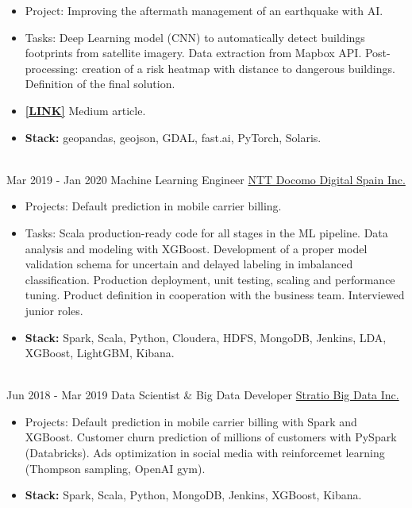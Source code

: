 \documentclass[letterpaper]{twentysecondcv} %
\begin{document}
\begin{twenty}
{\begin{itemize}
			\item Project: Improving the aftermath management of an earthquake with AI.
			\item Tasks: Deep Learning model (CNN) to automatically detect buildings footprints from satellite imagery. Data extraction from Mapbox API. Post-processing: creation of a risk heatmap with distance to dangerous buildings. Definition of the final solution.
			\item {\href{https://medium.com/omdena/estimating-street-safeness-after-an-earthquake-with-deep-learning-f2ae50b9e25e}{\textbf{[LINK]}}} Medium article.
			\item \textbf{Stack:} geopandas, geojson, GDAL, fast.ai, PyTorch, Solaris.
        \end{itemize}}
        \\
\twentyitem
    	{Mar 2019 - }
		{Jan 2020}
        {Machine Learning Engineer}
        {\href{https://www.docomodigital.com/}{NTT Docomo Digital Spain Inc.}}
        {}
        {\begin{itemize}
        \item Projects: Default prediction in mobile carrier billing. 
        \item Tasks: Scala production-ready code for all stages in the ML pipeline. Data analysis and modeling with XGBoost. Development of a proper model validation schema for uncertain and delayed labeling in imbalanced classification. Production deployment, unit testing, scaling and performance tuning. Product definition in cooperation with the business team. Interviewed junior roles.
        \item \textbf{Stack:} Spark, Scala, Python, Cloudera, HDFS, MongoDB, Jenkins, LDA, XGBoost, LightGBM, Kibana.
        \end{itemize}}
        \\
\twentyitem
    	{Jun 2018 -}
		{Mar 2019}
        {Data Scientist \& Big Data Developer}
        {\href{http://www.stratio.com/}{Stratio Big Data Inc.}}
        {}
        {\begin{itemize}
        \item Projects: Default prediction in mobile carrier billing with Spark and XGBoost. Customer churn prediction of millions of customers with PySpark (Databricks). Ads optimization in social media with reinforcemet learning (Thompson sampling, OpenAI gym). 
        \item \textbf{Stack:} Spark, Scala, Python, MongoDB, Jenkins, XGBoost, Kibana. 
        \end{itemize}}
        \\     %


\end{twenty}
\end{document}
